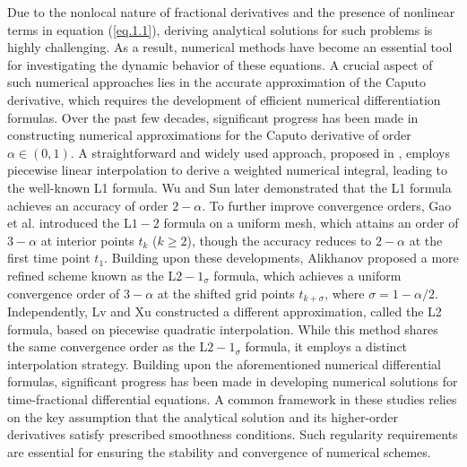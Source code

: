 \documentclass{siamart171218}
\theoremstyle{remark}
\theoremstyle{example}
\numberwithin{equation}{section}
\begin{document}
Due to the nonlocal nature of fractional derivatives and the presence of nonlinear terms in equation (\ref{eq.1.1}), deriving analytical solutions for such problems is highly challenging. As a result, numerical methods have become an essential tool for investigating the dynamic behavior of these equations. A crucial aspect of such numerical approaches lies in the accurate approximation of the Caputo derivative, which requires the development of efficient numerical differentiation formulas.
Over the past few decades, significant progress has been made in constructing numerical approximations for the Caputo derivative of order $\alpha \in (0,1)$. A straightforward and widely used approach, proposed in \cite{Oldham}, employs piecewise linear interpolation to derive a weighted numerical integral, leading to the well-known L1 formula. Wu and Sun \cite{Sun} later demonstrated that the L1 formula achieves an accuracy of order $2 - \alpha$. To further improve convergence orders, Gao et al. \cite{Gao2014} introduced the L$1-2$ formula on a uniform mesh, which attains an order of $3 - \alpha$ at interior points $t_k$ ($k \geq 2$), though the accuracy reduces to $2 - \alpha$ at the first time point $t_1$.
Building upon these developments, Alikhanov \cite{Alikhanov} proposed a more refined scheme known as the L$2-1_\sigma$ formula, which achieves a uniform convergence order of $3 - \alpha$ at the shifted grid points $t_{k+\sigma}$, where $\sigma = 1 - {\alpha}/{2}$. Independently, Lv and Xu \cite{Lv} constructed a different approximation, called the L2 formula, based on piecewise quadratic interpolation. While this method shares the same convergence order as the L$2-1_\sigma$ formula, it employs a distinct interpolation strategy.
Building upon the aforementioned numerical differential formulas, significant progress has been made in developing numerical solutions for time-fractional differential equations. A common framework in these studies relies on the key assumption that the analytical solution and its higher-order derivatives satisfy prescribed smoothness conditions. Such regularity requirements are essential for ensuring the stability and convergence of numerical schemes.
\end{document}
